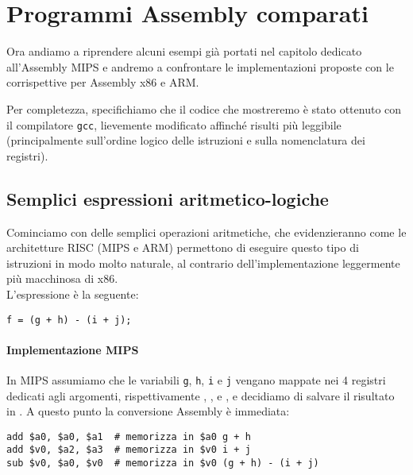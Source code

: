 \documentclass[class=book, crop=false, oneside]{standalone}
\begin{document}
\chapter{Programmi Assembly comparati}\label{ch:asm}
Ora andiamo a riprendere alcuni esempi già portati nel capitolo dedicato all'Assembly MIPS e andremo a confrontare le implementazioni proposte con le corrispettive per Assembly x86 e ARM.

Per completezza, specifichiamo che il codice che mostreremo è stato ottenuto con il compilatore \texttt{gcc}, lievemente modificato affinché risulti più leggibile (principalmente sull'ordine logico delle istruzioni e sulla nomenclatura dei registri).

\section{Semplici espressioni aritmetico-logiche}
Cominciamo con delle semplici operazioni aritmetiche, che evidenzieranno come le architetture RISC (MIPS e ARM) permettono di eseguire questo tipo di istruzioni in modo molto naturale, al contrario dell'implementazione leggermente più macchinosa di x86.\\
L'espressione è la seguente:
\begin{verbatim}
f = (g + h) - (i + j);
\end{verbatim}

\subsubsection{Implementazione MIPS}
In MIPS assumiamo che le variabili \texttt{g}, \texttt{h}, \texttt{i} e \texttt{j} vengano mappate nei 4 registri dedicati agli argomenti, rispettivamente , ,  e , e decidiamo di salvare il risultato in . A questo punto la conversione Assembly è immediata:
\begin{verbatim}
add $a0, $a0, $a1  # memorizza in $a0 g + h
add $v0, $a2, $a3  # memorizza in $v0 i + j
sub $v0, $a0, $v0  # memorizza in $v0 (g + h) - (i + j)
\end{verbatim}
\end{document}
